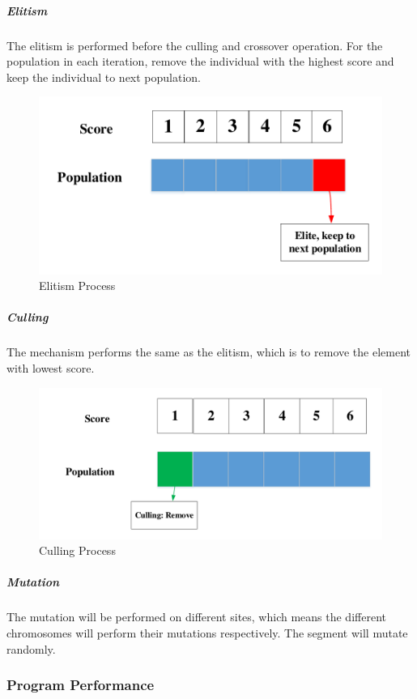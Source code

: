 \documentclass[11pt, a4paper]{article}
\begin{document}
\subparagraph{Elitism}

The elitism is performed before the culling and crossover operation. For the population in each iteration, remove the individual with the highest score and keep the individual to next population. 

\begin{figure}[htbp]
	\centering 
	\includegraphics[scale=0.4]{elitism}
	\caption{Elitism Process} %
\end{figure}


\subparagraph{Culling}

The mechanism performs the same as the elitism, which is to remove the element with lowest score. 

\begin{figure}[htbp]
	\centering 
	\includegraphics[scale=0.5]{culling}
	\caption{Culling Process} %
\end{figure}


\subparagraph{Mutation}

The mutation will be performed on different sites, which means the different chromosomes will perform their mutations respectively. The segment will mutate randomly.



\subsubsection{Program Performance}
\end{document}
